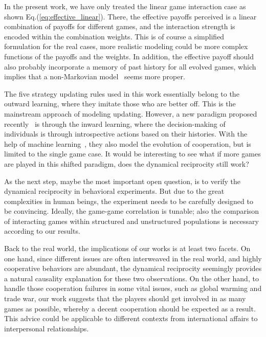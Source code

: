 \documentclass[showpacs,superscriptaddress,reprint,nofootinbib,amsmath,amssymb,aps,pre]{revtex4-1}
\begin{document}
In the present work, we have only treated the linear game interaction case as shown Eq.(\ref{eq:effective_linear}). There, the effective payoffs perceived is a linear combination of payoffs for different games, and the interaction strength is encoded within the combination weights. This is of course a simplified formulation for the real cases, more realistic modeling could be more complex functions of the payoffs and the weights. In addition, the effective payoff should also probably incorporate a memory of past history for all evolved games, which implies that a non-Markovian model~\cite{wang2006memory,Kampen2007stochastic} seems more proper.

The five strategy updating rules used in this work essentially belong to the outward learning, where they imitate those who are better off. This is the mainstream approach of modeling updating. However, a new paradigm proposed recently~\cite{zhang2020oscillatory,zhang2020understanding} is through the inward learning, where the decision-making of individuals is through introspective actions based on their histories. With the help of machine learning~\cite{carleo2019machine}, they also model the evolution of cooperation, but is limited to the single game case. It would be interesting to see what if more games are played in this shifted paradigm, does the dynamical reciprocity still work? 

As the next step, maybe the most important open question, is to verify the dynamical reciprocity in behavioral experiments. But due to the great complexities in human beings, the experiment needs to be carefully designed to be convincing. Ideally, the game-game correlation is tunable; also the comparison of interacting games within structured and unstructured populations is necessary according to our results.

Back to the real world, the implications of our works is at least two facets. On one hand, since different issues are often interweaved in the real world, and highly cooperative behaviors are abundant, the dynamical reciprocity seemingly provides a natural causality explanation for these two observations. On the other hand, to handle those cooperation failures in some vital issues, such as global warming and trade war, our work suggests that the players should get involved in as many games as possible, whereby a decent cooperation should be expected as a result. This advice could be applicable to different contexts from international affairs to interpersonal relationships.
\end{document}
